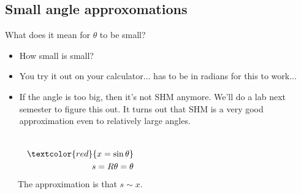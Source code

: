 \documentclass[aspectratio=169,
hyperref={colorlinks,urlcolor=blue}
]{beamer}
\begin{document}
\subsection{Small angle approxomations}
\label{subsec:smallangles}
\begin{frame}{What does it mean for $\theta$ to be small?}
\begin{itemize}
\item How small is small?
\item You try it out on your calculator...  has to be in radians for this to work...
\item If the angle is too big, then it's not SHM anymore. We'll do a lab next semester to figure this out. It turns out that SHM is a very good approximation even to relatively large angles.
\end{itemize}
\begin{columns}

\begin{center}
\end{center}
\begin{align*}
\textcolor{red}{x=\sin\theta}\\
s=R\theta=\theta
\end{align*}
The approximation is that $s\sim x$.
\end{columns}
\end{frame}


\end{document}
